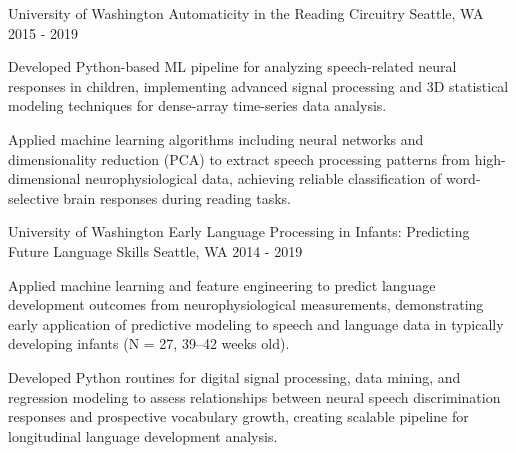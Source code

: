 \newpage
{}


\begin{cventries}
    \cventry
      {University of Washington} %
      {Automaticity in the Reading Circuitry} %
      {Seattle, WA} %
      {2015 - 2019} %
      {
        \begin{cvitems} %
          \item {Developed Python-based ML pipeline for analyzing speech-related neural responses in children, implementing advanced signal processing and 3D statistical modeling techniques for dense-array time-series data analysis.}
          \item {Applied machine learning algorithms including neural networks and dimensionality reduction (PCA) to extract speech processing patterns from high-dimensional neurophysiological data, achieving reliable classification of word-selective brain responses during reading tasks.}
        \end{cvitems}
      }

    \cventry
      {University of Washington} %
      {Early Language Processing in Infants: Predicting Future Language Skills} %
      {Seattle, WA} %
      {2014 - 2019} %
      {
        \begin{cvitems} %
          \item {Applied machine learning and feature engineering to predict language development outcomes from neurophysiological measurements, demonstrating early application of predictive modeling to speech and language data in typically developing infants (N = 27, 39–42 weeks old).}
          \item {Developed Python routines for digital signal processing, data mining, and regression modeling to assess relationships between neural speech discrimination responses and prospective vocabulary growth, creating scalable pipeline for longitudinal language development analysis.}
        \end{cvitems}
      }


\end{cventries}
